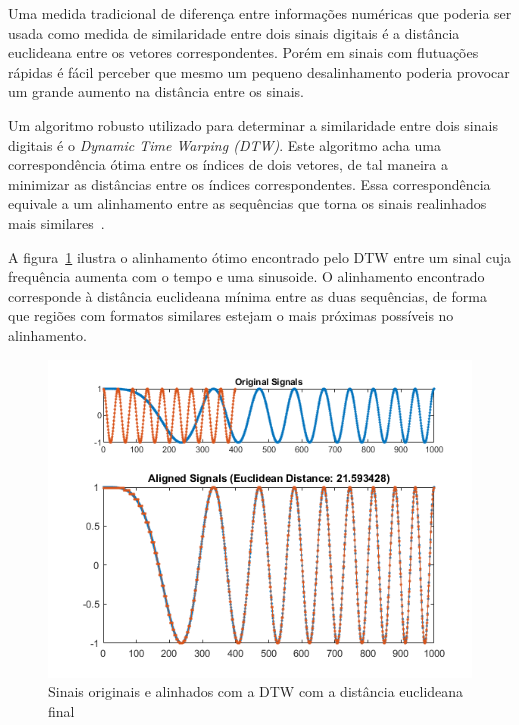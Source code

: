 Uma medida tradicional de diferença entre informações numéricas que poderia ser usada como medida de similaridade entre dois sinais digitais é a distância euclideana entre os vetores correspondentes. Porém em sinais com flutuações rápidas é fácil perceber que mesmo um pequeno desalinhamento poderia provocar um grande aumento na distância entre os sinais.

Um algoritmo robusto utilizado para determinar a similaridade entre dois sinais digitais é o \textit{Dynamic Time Warping (DTW)}. Este algoritmo acha uma correspondência ótima entre os índices de dois vetores, de tal maneira a minimizar as distâncias entre os índices correspondentes. Essa correspondência equivale a um alinhamento entre as sequências que torna os sinais realinhados mais similares~\citep{shou2005fast}. 

A figura~\ref{fig:matlab-dtw} ilustra o alinhamento ótimo encontrado pelo DTW entre um sinal cuja frequência aumenta com o tempo e uma sinusoide. O alinhamento encontrado corresponde à distância euclideana mínima entre as duas sequências, de forma que regiões com formatos similares estejam o mais próximas possíveis no alinhamento.

\begin{figure}[htb]
\centering
\includegraphics[width=12cm]{figuras/DynamicTimeWarpingOfRealChirpAndSinusoidExample_01.png}
\caption{Sinais originais e alinhados com a DTW com a distância euclideana final \citep{matlab-dtw}}
\label{fig:matlab-dtw}
\end{figure}

\newcommand{\dist}{\mbox{dist}}


